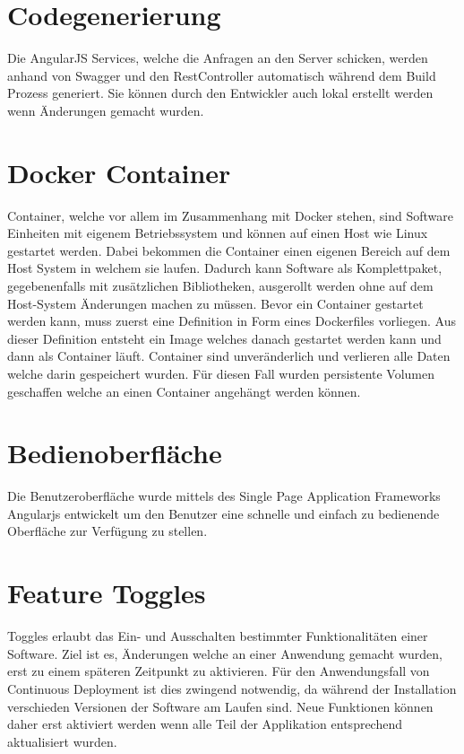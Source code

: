 \section{Codegenerierung}

Die AngularJS Services, welche die Anfragen an den Server schicken, werden anhand von Swagger und den RestController automatisch während dem Build Prozess generiert. Sie können durch den Entwickler auch lokal erstellt werden wenn Änderungen gemacht wurden.

\section{Docker Container}
\label{container}
Container, welche vor allem im Zusammenhang mit Docker stehen, sind Software Einheiten mit eigenem Betriebssystem und können auf einen Host wie Linux gestartet werden. Dabei bekommen die Container einen eigenen Bereich auf dem Host System in welchem sie laufen. Dadurch kann Software als Komplettpaket, gegebenenfalls mit zusätzlichen Bibliotheken, ausgerollt werden ohne auf dem Host-System Änderungen machen zu müssen. \newline
Bevor ein Container gestartet werden kann, muss zuerst eine Definition in Form eines Dockerfiles vorliegen. Aus dieser Definition entsteht ein Image welches danach gestartet werden kann und dann als Container läuft. Container sind unveränderlich und verlieren alle Daten welche darin gespeichert wurden. Für diesen Fall wurden persistente Volumen geschaffen welche an einen Container angehängt werden können.

\section{Bedienoberfläche}

Die Benutzeroberfläche wurde mittels des Single Page Application Frameworks Angularjs entwickelt um den Benutzer eine schnelle und einfach zu bedienende Oberfläche zur Verfügung zu stellen. 

\section{Feature Toggles}
\label{toggles}

Toggles erlaubt das Ein- und Ausschalten bestimmter Funktionalitäten einer Software. Ziel ist es, Änderungen welche an einer Anwendung gemacht wurden, erst zu einem späteren Zeitpunkt zu aktivieren. Für den Anwendungsfall von Continuous Deployment ist dies zwingend notwendig, da während der Installation verschieden Versionen der Software am Laufen sind. Neue Funktionen können daher erst aktiviert werden wenn alle Teil der Applikation entsprechend aktualisiert wurden.

